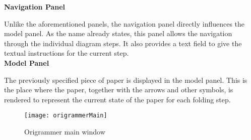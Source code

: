 \textbf{Navigation Panel}

Unlike the aforementioned panels, the navigation panel directly influences the model panel. As the name already states, this panel allows the navigation through the individual diagram steps. It also provides a text field to give the textual instructions for the current step.\\

\textbf{Model Panel}

The previously specified piece of paper is displayed in the model panel. This is the place where the paper, together with the arrows and other symbols, is rendered to represent the current state of the paper for each folding step.\\

\begin{figure}[h]
	\centering
	\texttt{[image: origrammerMain]}
	\caption{Origrammer main window}
	\label{fig:origrammerMain}
\end{figure}